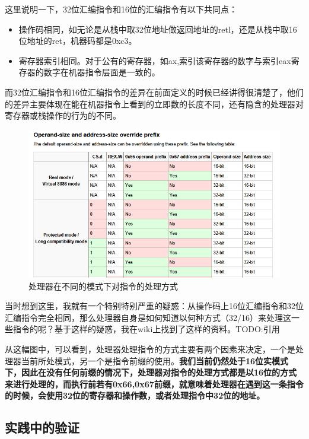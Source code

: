 \documentclass[forprint]{WHUBachelor}
\begin{document}
这里说明一下，32位汇编指令和16位的汇编指令有以下共同点：

\begin{itemize}
  \item 操作码相同，如无论是从栈中取32位地址做返回地址的retl，还是从栈中取16位地址的ret，机器码都是0xc3。
  \item 寄存器索引相同。对于公有的寄存器，如ax,索引该寄存器的数字与索引eax寄存器的数字在机器指令层面是一致的。
\end{itemize} 

而32位汇编指令和16位汇编指令的差异在前面定义的时候已经讲得很清楚了，他们的差异主要体现在能在机器指令上看到的立即数的长度不同，还有隐含的处理器对寄存器或栈操作的行为的不同。


\begin{figure}[htp]
  \centering
  \includegraphics[width=12cm]{"./figure/wiki_prefix.png"}
  \caption{处理器在不同的模式下对指令的处理方式}
  \label{fig:wiki-prefix}
\end{figure}

当时想到这里，我就有一个特别特别严重的疑惑：从操作码上16位汇编指令和32位汇编指令完全相同，那么处理器自身是如何知道以何种方式（32/16）来处理这一些指令的呢？基于这样的疑惑，我在wiki上找到了这样的资料。TODO:引用


从这幅图中，可以看到，处理器处理指令的方式主要有两个因素来决定，一个是处理器当前所处模式，另一个是指令前缀的使用。\textbf{我们当前仍然处于16位实模式下，因此在没有任何前缀的情况下，处理器对指令的处理方式都是以16位的方式来进行处理的，而执行前若有0x66,0x67前缀，就意味着处理器在遇到这一条指令的时候，会使用32位的寄存器和操作数，或者处理指令中32位的地址。}

\subsection{实践中的验证}
\end{document}
